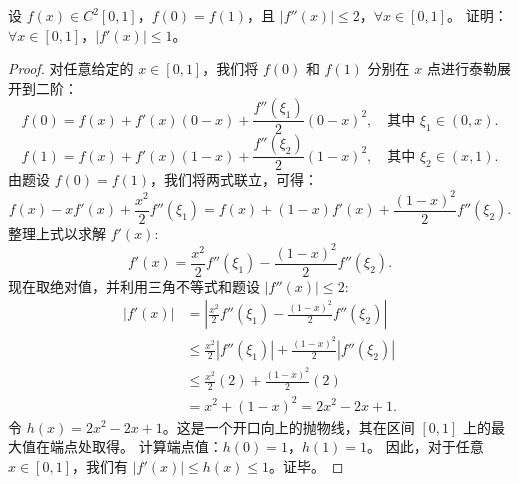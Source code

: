 \documentclass[lang=cn,10pt,thmcnt=section]{elegantbook}
\begin{document}
\begin{example}
    设 \( f(x) \in C^2[0,1] \)，\( f(0) = f(1) \)，且 \( |f''(x)| \leq 2 \)，\(\forall x \in [0,1]\)。  
证明：\(\forall x \in [0,1]，|f'(x)| \leq 1\)。
\end{example}
\begin{proof}
    对任意给定的 $x \in [0,1]$，我们将 $f(0)$ 和 $f(1)$ 分别在 $x$ 点进行泰勒展开到二阶：
    \[ f(0) = f(x) + f'(x)(0-x) + \frac{f''(\xi_1)}{2}(0-x)^2, \quad \text{其中 } \xi_1 \in (0,x). \]
    \[ f(1) = f(x) + f'(x)(1-x) + \frac{f''(\xi_2)}{2}(1-x)^2, \quad \text{其中 } \xi_2 \in (x,1). \]
    由题设 $f(0)=f(1)$，我们将两式联立，可得：
    \[ f(x) - xf'(x) + \frac{x^2}{2}f''(\xi_1) = f(x) + (1-x)f'(x) + \frac{(1-x)^2}{2}f''(\xi_2). \]
    整理上式以求解 $f'(x)$:
    \[ f'(x) = \frac{x^2}{2}f''(\xi_1) - \frac{(1-x)^2}{2}f''(\xi_2). \]
    现在取绝对值，并利用三角不等式和题设 $|f''(x)| \le 2$:
    \begin{align*}
        |f'(x)| &= \left| \frac{x^2}{2}f''(\xi_1) - \frac{(1-x)^2}{2}f''(\xi_2) \right| \\
        &\le \frac{x^2}{2}|f''(\xi_1)| + \frac{(1-x)^2}{2}|f''(\xi_2)| \\
        &\le \frac{x^2}{2}(2) + \frac{(1-x)^2}{2}(2) \\
        &= x^2 + (1-x)^2 = 2x^2 - 2x + 1.
    \end{align*}
    令 $h(x) = 2x^2 - 2x + 1$。这是一个开口向上的抛物线，其在区间 $[0,1]$ 上的最大值在端点处取得。
    计算端点值：$h(0)=1$，$h(1)=1$。
    因此，对于任意 $x \in [0,1]$，我们有 $|f'(x)| \le h(x) \le 1$。证毕。
\end{proof}
\end{document}
